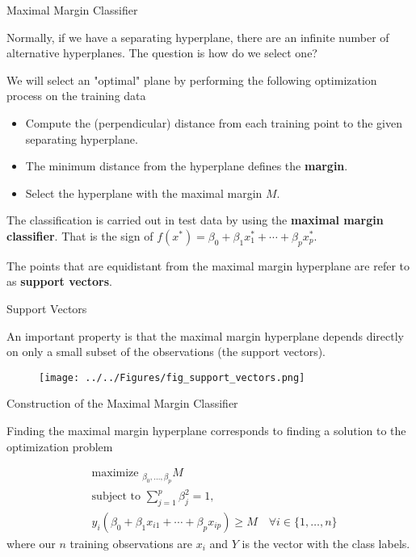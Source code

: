 \documentclass{beamer}
\begin{document}
\begin{frame}{Maximal Margin Classifier}
	
	Normally, if we have a separating hyperplane, there are an infinite number of alternative hyperplanes. The question is how do we select one?
	
	We will select an "optimal" plane by performing the following optimization process on the training data
	
	\begin{itemize}
		\item Compute the (perpendicular) distance from each training point to the given separating hyperplane.
		\item The minimum distance from the hyperplane defines the {\bf margin}.
		\item Select the hyperplane with the maximal margin $M$.
	\end{itemize}
	The classification is carried out in test data by using the {\bf maximal margin classifier}. That is the sign of $f(x^*)= \beta_0 + \beta_1 x_1^* + \cdots + \beta_p x_p^*$. 
	
	The points that are equidistant from the maximal margin hyperplane are refer to as {\bf support vectors}. 
\end{frame}

\begin{frame}{Support Vectors}
	
	An important property is that the maximal margin hyperplane depends directly on only a small subset of the observations (the support vectors).
	
		\begin{figure}[h]
		\centering
		\texttt{[image: ../../Figures/fig\_support\_vectors.png]}
	\end{figure}	
\end{frame}

\begin{frame}{Construction of the Maximal Margin Classifier}
	
	Finding the maximal margin hyperplane corresponds to finding a solution to the optimization problem
	
	\begin{equation*}
		\begin{split}
			&\textrm{maximize }_{\beta_0,\ldots, \beta_p} M \\
			&\textrm{subject to } \sum_{j=1}^p \beta_j^2 =1 , \\
			& y_i (\beta_0 + \beta_1 x_{i1}+ \cdots + \beta_p x_{ip} )\ge M \quad \forall i \in \{1,\ldots,n\}
		\end{split}
	\end{equation*}
where our $n$ training observations are $x_{i}$ and $Y$ is the vector with the class labels. 
\end{frame}
\end{document}
